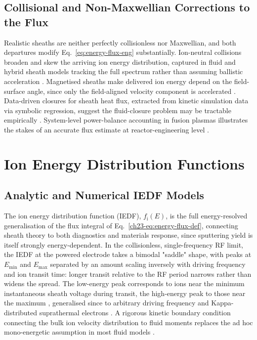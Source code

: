 \subsection{Collisional and Non-Maxwellian Corrections to the Flux}

Realistic sheaths are neither perfectly collisionless nor Maxwellian, and both departures modify Eq.~\eqref{eq:energy-flux-eng} substantially. Ion-neutral collisions broaden and skew the arriving ion energy distribution, captured in fluid and hybrid sheath models tracking the full spectrum rather than assuming ballistic acceleration \cite{ref0074}. Magnetised sheaths make delivered ion energy depend on the field-surface angle, since only the field-aligned velocity component is accelerated \cite{ref0088}. Data-driven closures for sheath heat flux, extracted from kinetic simulation data via symbolic regression, suggest the fluid-closure problem may be tractable empirically \cite{ref0101}. System-level power-balance accounting in fusion plasmas illustrates the stakes of an accurate flux estimate at reactor-engineering level \cite{ref0093}.

\section{Ion Energy Distribution Functions}

\subsection{Analytic and Numerical IEDF Models}

The ion energy distribution function (IEDF), $f_{\mathrm{i}}(E)$, is the full energy-resolved generalisation of the flux integral of Eq.~\eqref{ch23-eq:energy-flux-def}, connecting sheath theory to both diagnostics and materials response, since sputtering yield is itself strongly energy-dependent. In the collisionless, single-frequency RF limit, the IEDF at the powered electrode takes a bimodal "saddle" shape, with peaks at $E_{\min}$ and $E_{\max}$ separated by an amount scaling inversely with driving frequency and ion transit time: longer transit relative to the RF period narrows rather than widens the spread. The low-energy peak corresponds to ions near the minimum instantaneous sheath voltage during transit, the high-energy peak to those near the maximum \cite{ref0123}, generalised since to arbitrary driving frequency and Kappa-distributed suprathermal electrons \cite{ref0123}. A rigorous kinetic boundary condition connecting the bulk ion velocity distribution to fluid moments replaces the ad hoc mono-energetic assumption in most fluid models \cite{ref0119}.


